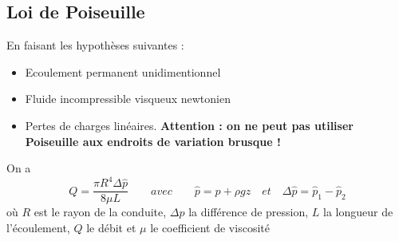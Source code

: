 \subsection*{Loi de Poiseuille}
En faisant les hypothèses suivantes :
\begin{itemize}
	\item Ecoulement permanent unidimentionnel
	\item Fluide incompressible visqueux newtonien
	\item Pertes de charges linéaires. \textbf{Attention : on ne peut pas utiliser Poiseuille aux endroits de variation brusque !}
\end{itemize}
On a 
\begin{equation}
	Q = \frac{\pi R^4 \Delta \hat{p}}{8\mu L} \qquad avec \qquad \hat{p} = p+\rho g z \quad et \quad \Delta \hat{p} = \hat{p}_1 - \hat{p}_2
\end{equation}
où $R$ est le rayon de la conduite, $\Delta \hat{p}$ la différence de pression, $L$ la longueur de l'écoulement, $Q$ le débit et $\mu$ le coefficient de viscosité